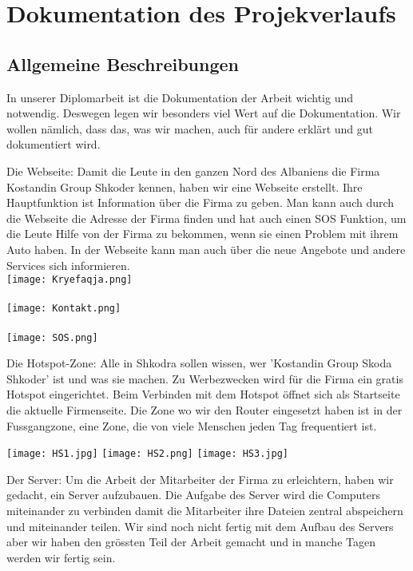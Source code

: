 \chapter{Dokumentation des Projekverlaufs}
\section{Allgemeine Beschreibungen}
In unserer Diplomarbeit ist die Dokumentation der Arbeit wichtig und notwendig. Deswegen legen wir
besonders viel Wert auf die Dokumentation. Wir wollen n\"amlich, dass das, was wir machen, auch f\"ur andere erkl\"art und gut dokumentiert wird.


Die Webseite:
Damit die Leute in den ganzen Nord des Albaniens die Firma Kostandin Group Shkoder kennen, haben wir eine Webseite erstellt. Ihre Hauptfunktion ist Information \"uber die Firma zu geben. Man kann auch durch die Webseite die Adresse der Firma finden und hat auch einen SOS Funktion, um die Leute Hilfe von der Firma zu bekommen, wenn sie einen Problem mit ihrem Auto haben. In der Webseite kann man  auch \"uber die neue Angebote und andere Services sich informieren. \\

\texttt{[image: Kryefaqja.png]} \\
\\
\texttt{[image: Kontakt.png]} \\
\\
\texttt{[image: SOS.png]}



Die Hotspot-Zone:
Alle in Shkodra sollen wissen, wer 'Kostandin Group Skoda Shkoder' ist und was sie machen. Zu Werbezwecken wird f\"ur die Firma ein gratis Hotspot eingerichtet. Beim Verbinden mit dem Hotspot \"offnet sich als Startseite die aktuelle Firmenseite. Die Zone wo wir den Router eingesetzt haben ist in der Fussgangzone, eine Zone, die von viele Menschen jeden Tag frequentiert ist.

\texttt{[image: HS1.jpg]} 
\texttt{[image: HS2.png]}
\texttt{[image: HS3.jpg]}

Der Server:
Um die Arbeit der Mitarbeiter der Firma zu erleichtern, haben wir gedacht, ein Server aufzubauen. Die Aufgabe des Server wird die Computers miteinander zu verbinden damit die Mitarbeiter ihre Dateien zentral abspeichern und miteinander teilen. Wir sind noch nicht fertig mit dem Aufbau des Servers aber wir haben den gr\"ossten Teil der Arbeit gemacht und in manche Tagen werden wir fertig sein.

